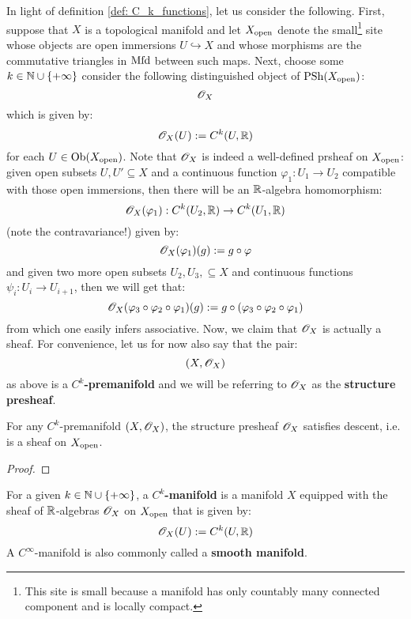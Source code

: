         In light of definition \ref{def: C_k_functions}, let us consider the following. First, suppose that $X$ is a topological manifold and let $X_{\mathrm{open}}$ denote the small\footnote{This site is small because a manifold has only countably many connected component and is locally compact.} site whose objects are open immersions $U \hookrightarrow X$ and whose morphisms are the commutative triangles in $\mathrm{Mfd}$ between such maps. Next, choose some $k \in \mathbb{N} \cup \{+\infty\}$ consider the following distinguished object of $\mathrm{PSh}(X_{\mathrm{open}})$:
            $$\mathscr{O}_X$$
        which is given by:
            $$\mathscr{O}_X(U) := C^k(U, \mathbb{R})$$
        for each $U \in \mathrm{Ob}(X_{\mathrm{open}})$. Note that $\mathscr{O}_X$ is indeed a well-defined prsheaf on $X_{\mathrm{open}}$: given open subsets $U, U' \subseteq X$ and a continuous function $\varphi_1: U_1 \to U_2$ compatible with those open immersions, then there will be an $\mathbb{R}$-algebra homomorphism:
            $$\mathscr{O}_X(\varphi_1): C^k(U_2, \mathbb{R}) \to C^k(U_1, \mathbb{R})$$
        (note the contravariance!) given by:
            $$\mathscr{O}_X(\varphi_1)(g) := g \circ \varphi$$
        and given two more open subsets $U_2, U_3,  \subseteq X$ and continuous functions $\psi_i: U_i \to U_{i + 1}$, then we will get that:
            $$\mathscr{O}_X(\varphi_3 \circ \varphi_2 \circ \varphi_1)(g) := g \circ ( \varphi_3 \circ \varphi_2 \circ \varphi_1 )$$
        from which one easily infers associative. Now, we claim that $\mathscr{O}_X$ is actually a sheaf. For convenience, let us for now also say that the pair:
            $$(X, \mathscr{O}_X)$$
        as above is a \textbf{$C^k$-premanifold} and we will be referring to $\mathscr{O}_X$ as the \textbf{structure presheaf}.
        \begin{proposition} \label{prop: premanifolds_are_ringed_spaces}
            For any $C^k$-premanifold $(X, \mathscr{O}_X)$, the structure presheaf $\mathscr{O}_X$ satisfies descent, i.e. is a sheaf on $X_{\mathrm{open}}$. 
        \end{proposition}
            \begin{proof}
                
            \end{proof}

        \begin{definition}[$C^k$-manifolds] \label{def: C_k_manifolds}
            For a given $k \in \mathbb{N} \cup \{+\infty\}$, a \textbf{$C^k$-manifold} is a manifold $X$ equipped with the sheaf of $\mathbb{R}$-algebras $\mathscr{O}_X$ on $X_{\mathrm{open}}$ that is given by:
                $$\mathscr{O}_X(U) := C^k(U, \mathbb{R})$$
            A $C^{\infty}$-manifold is also commonly called a \textbf{smooth manifold}.
        \end{definition}
        
